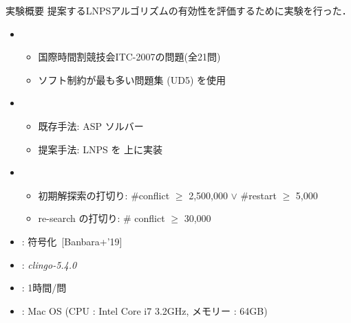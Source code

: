 \documentclass[11pt,dvipdfmx]{beamer}
\begin{document}
\begin{frame}{実験概要}
  提案するLNPSアルゴリズムの有効性を評価するために実験を行った．
  \bigskip
  \begin{itemize}
  \item {}
    \begin{itemize}
    \item 国際時間割競技会ITC-2007の問題(全21問)
    \item ソフト制約が最も多い問題集 (UD5) を使用
    \end{itemize}
  \item {}
    \begin{itemize}
    \item 既存手法: ASP ソルバー{\clingo}
    \item 提案手法: LNPS を{\clingo} 上に実装
    \end{itemize}
   \item {}
    \begin{itemize}
    \item 初期解探索の打切り:
      \#conflict $\geq$ 2,500,000 $\lor$ \#restart $\geq$ 5,000
     \item re-search の打切り: \# conflict $\geq$ 30,000
    \end{itemize}
  \item {}: {\teaspoon} 符号化~[Banbara+'19]
  \item {}: \textit{clingo-5.4.0}
  \item {}: 1時間/問
  \item {}: Mac OS (CPU : Intel Core i7 3.2GHz, メモリー : 64GB) 
  \end{itemize}
\end{frame}
\end{document}
